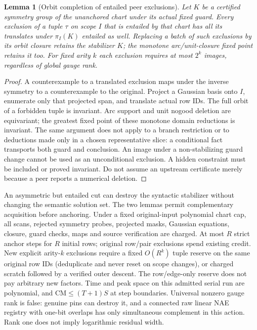 \documentclass[11pt]{article}
\newtheorem{lemma}[theorem]{Lemma}
\begin{document}
\begin{lemma}[Orbit completion of entailed peer exclusions]\label{lem:i25-orbit}
Let $K$ be a certified symmetry group of the unanchored chart under its actual fixed guard. Every exclusion of a tuple $\tau$ on scope $I$ that is entailed by that chart has all its translates under $\pi_I(K)$ entailed as well. Replacing a batch of such exclusions by its orbit closure retains the stabilizer $K$; the monotone arc/unit-closure fixed point retains it too. For fixed arity $k$ each exclusion requires at most $2^k$ images, regardless of global gauge rank.
\end{lemma}
\begin{proof}
A counterexample to a translated exclusion maps under the inverse symmetry to a counterexample to the original. Project a Gaussian basis onto $I$, enumerate only that projected span, and translate actual row IDs. The full orbit of a forbidden tuple is invariant. Arc support and unit nogood deletion are equivariant; the greatest fixed point of these monotone domain reductions is invariant. The same argument does not apply to a branch restriction or to deductions made only in a chosen representative slice: a conditional fact transports both guard and conclusion. An image under a non-stabilizing guard change cannot be used as an unconditional exclusion. A hidden constraint must be included or proved invariant. Do not assume an upstream certificate merely because a peer reports a numerical deletion.
\end{proof}
An asymmetric but entailed cut can destroy the syntactic stabilizer without changing the semantic solution set. The two lemmas permit complementary acquisition before anchoring. Under a fixed original-input polynomial chart cap, all scans, rejected symmetry probes, projected masks, Gaussian equations, closure, guard checks, maps and source verification are charged. At most $R$ strict anchor steps for $R$ initial rows; original row/pair exclusions spend existing credit. New explicit arity-$k$ exclusions require a fixed $O(R^k)$ tuple reserve on the same original row IDs (deduplicate and never reset on scope changes), or charged scratch followed by a verified outer descent. The row/edge-only reserve does not pay arbitrary new factors. Time and peak space on this admitted serial run are polynomial, and $\mathrm{CM}\le(T+1)S$ at step boundaries. Universal nonzero gauge rank is false: genuine pins can destroy it, and a connected raw linear NAE registry with one-bit overlaps has only simultaneous complement in this action. Rank one does not imply logarithmic residual width.
\end{document}
